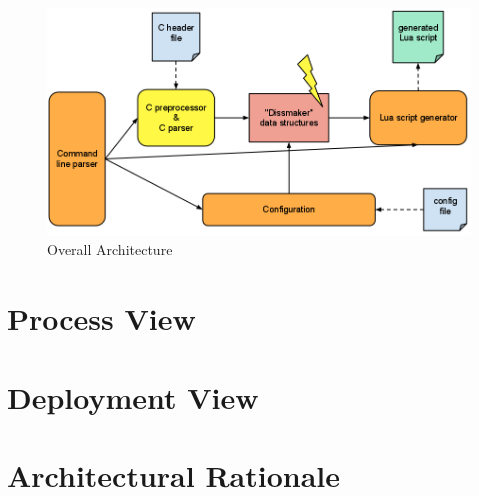 \begin{figure}[ht]
\includegraphics[width=\textwidth]{./planning/img/overall_design.png}
\caption{Overall Architecture}
\label{fig:logicalview}
\end{figure}

\section{Process View}


\section{Deployment View}

\section{Architectural Rationale}

